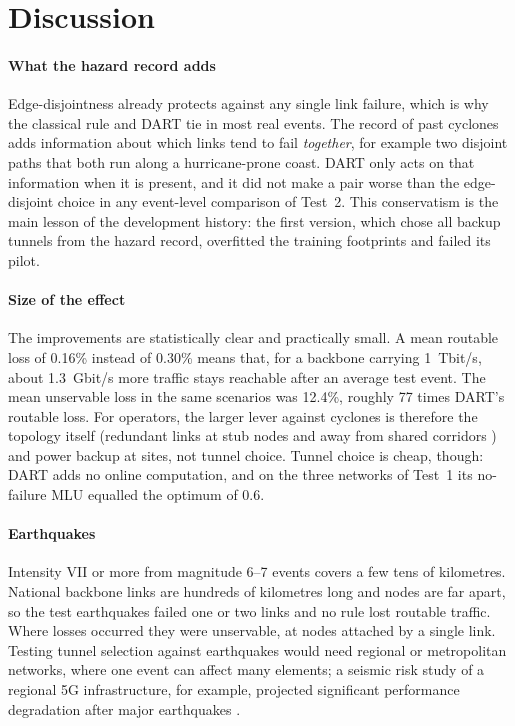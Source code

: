 \documentclass[preprint,12pt]{elsarticle}
\begin{document}
\section{Discussion}
\label{sec:discussion}

\paragraph{What the hazard record adds}
Edge-disjointness already protects against any single link failure, which is why the classical rule and DART tie in most real events. The record of past cyclones adds information about which links tend to fail \emph{together}, for example two disjoint paths that both run along a hurricane-prone coast. DART only acts on that information when it is present, and it did not make a pair worse than the edge-disjoint choice in any event-level comparison of Test~2. This conservatism is the main lesson of the development history: the first version, which chose all backup tunnels from the hazard record, overfitted the training footprints and failed its pilot.

\paragraph{Size of the effect}
The improvements are statistically clear and practically small. A mean routable loss of 0.16\% instead of 0.30\% means that, for a backbone carrying 1~Tbit/s, about 1.3~Gbit/s more traffic stays reachable after an average test event. The mean unservable loss in the same scenarios was 12.4\%, roughly 77 times DART's routable loss. For operators, the larger lever against cyclones is therefore the topology itself (redundant links at stub nodes and away from shared corridors \cite{andresthio22}) and power backup at sites, not tunnel choice. Tunnel choice is cheap, though: DART adds no online computation, and on the three networks of Test~1 its no-failure MLU equalled the optimum of 0.6.

\paragraph{Earthquakes}
Intensity VII or more from magnitude 6--7 events covers a few tens of kilometres. National backbone links are hundreds of kilometres long and nodes are far apart, so the test earthquakes failed one or two links and no rule lost routable traffic. Where losses occurred they were unservable, at nodes attached by a single link. Testing tunnel selection against earthquakes would need regional or metropolitan networks, where one event can affect many elements; a seismic risk study of a regional 5G infrastructure, for example, projected significant performance degradation after major earthquakes \cite{du24}.
\end{document}
